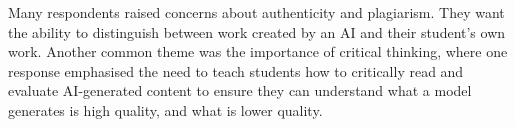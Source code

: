 Many respondents raised concerns about authenticity and plagiarism. They want the ability to distinguish between work created by an AI and their student’s own work. Another common theme was the importance of critical thinking, where one response emphasised the need to teach students how to critically read and evaluate AI-generated content to ensure they can understand what a model generates is high quality, and what is lower quality.














\cleardoublepage